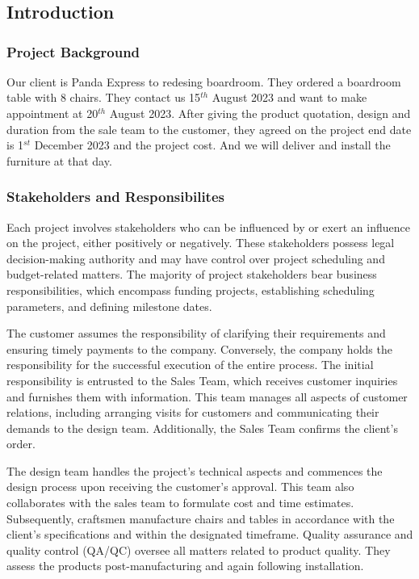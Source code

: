 \chapter[Part 2]{}
\section{Introduction}
\subsection{Project Background}
Our client is Panda Express to redesing boardroom.
They ordered a boardroom table with 8 chairs.
They contact us 15$^{th}$ August 2023 and
want to make appointment at 20$^{th}$ August 2023.
After giving the product quotation, design and duration from the sale team to the
customer, they agreed on the project end date is 1$^{st}$ December 2023 and the project
cost. And we will deliver and install the furniture at that day.
\subsection{Stakeholders and Responsibilites}
Each project involves stakeholders who can be influenced by or exert an influence on the project, either positively or negatively. These stakeholders possess legal decision-making authority and may have control over project scheduling and budget-related matters. The majority of project stakeholders bear business responsibilities, which encompass funding projects, establishing scheduling parameters, and defining milestone dates.


The customer assumes the responsibility of clarifying their requirements and ensuring timely payments to the company. Conversely, the company holds the responsibility for the successful execution of the entire process. The initial responsibility is entrusted to the Sales Team, which receives customer inquiries and furnishes them with information. This team manages all aspects of customer relations, including arranging visits for customers and communicating their demands to the design team. Additionally, the Sales Team confirms the client's order.


The design team handles the project's technical aspects and commences the design process upon receiving the customer's approval. This team also collaborates with the sales team to formulate cost and time estimates. Subsequently, craftsmen manufacture chairs and tables in accordance with the client's specifications and within the designated timeframe. Quality assurance and quality control (QA/QC) oversee all matters related to product quality. They assess the products post-manufacturing and again following installation.
\newpage
